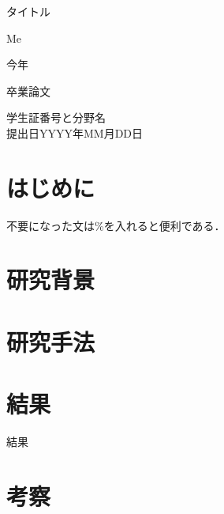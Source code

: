 \documentclass[paper=a4paper,hanging_punctuation,jafontscale=0.92469,titlepage,fontsize=12pt]{jlreq}
\begin{document}
  \begin{titlepage} %
    \vspace*{\fill} %
      \begin{center} %
        \LARGE タイトル \par
        \vspace{40mm} %
        \Large Me \par
        \vspace{40mm}
        今年 \par
        \vspace{15mm}
        卒業論文 \par
        \vspace{10mm}
        学生証番号と分野名 %
        \\ 提出日YYYY年MM月DD日
      \end{center}
      \vspace*{\fill} %
  \end{titlepage}
  \thispagestyle{empty} %
  \clearpage
  \tableofcontents %
  \thispagestyle{empty} %
  \clearpage
  \addtocounter{page}{-2} %
  \section{はじめに}
    不要になった文は\%を入れると便利である．%
      \clearpage
  \section{研究背景}
      \clearpage
  \section{研究手法}
      \clearpage
  \section{結果}
      \quad %
      結果
      \qquad %
      \clearpage%
  \section{考察}
\end{document}

